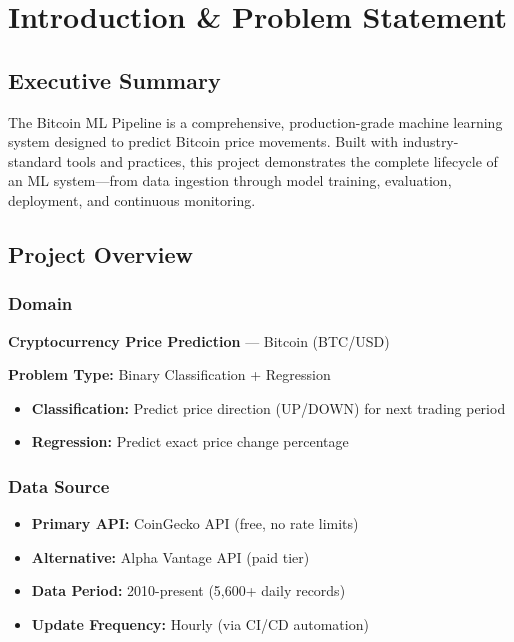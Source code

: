 \chapter{Introduction \& Problem Statement}
\label{ch:introduction}

\section{Executive Summary}

The Bitcoin ML Pipeline is a comprehensive, production-grade machine learning system designed to predict Bitcoin price movements. Built with industry-standard tools and practices, this project demonstrates the complete lifecycle of an ML system—from data ingestion through model training, evaluation, deployment, and continuous monitoring.

\section{Project Overview}

\subsection{Domain}
\textbf{Cryptocurrency Price Prediction} — Bitcoin (BTC/USD)

\textbf{Problem Type:} Binary Classification + Regression
\begin{itemize}
    \item \textbf{Classification:} Predict price direction (UP/DOWN) for next trading period
    \item \textbf{Regression:} Predict exact price change percentage
\end{itemize}

\subsection{Data Source}
\begin{itemize}
    \item \textbf{Primary API:} CoinGecko API (free, no rate limits)
    \item \textbf{Alternative:} Alpha Vantage API (paid tier)
    \item \textbf{Data Period:} 2010-present (5,600+ daily records)
    \item \textbf{Update Frequency:} Hourly (via CI/CD automation)
\end{itemize}

